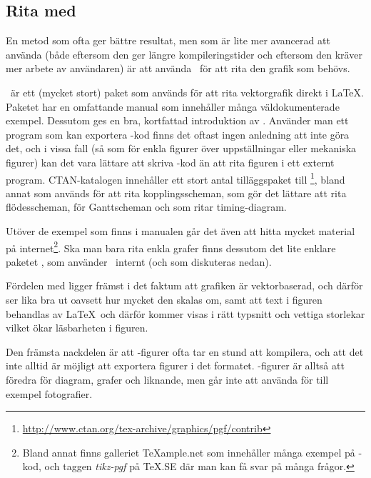 \documentclass[10pt,../../a4.tex]{subfiles}
\begin{document}
\subsection{Rita med \PGFTikZ}
En metod som ofta ger bättre resultat, men som är lite mer avancerad att
använda (både eftersom den ger längre kompileringstider och eftersom den
kräver mer arbete av användaren) är att använda \PGFTikZ\ för att rita
den grafik som behövs.

\PGFTikZ\ är ett (mycket stort) paket som används för att rita
vektorgrafik direkt i \LaTeX. Paketet har en omfattande manual
\parencite{Tantau10} som innehåller många väldokumenterade exempel.
Dessutom ges en bra, kortfattad introduktion av \textcite{Mertz07}.
Använder man ett program som kan exportera \PGFTikZ-kod finns det oftast
ingen anledning att inte göra det, och i vissa fall (så som för enkla
figurer över uppställningar eller mekaniska figurer) kan det vara 
lättare att skriva \PGFTikZ-kod än att rita figuren i ett externt program.
CTAN-katalogen innehåller ett stort antal tilläggspaket till \PGFTikZ%
\footnote{\url{http://www.ctan.org/tex-archive/graphics/pgf/contrib}},
bland annat  \parencite{Redaelli12} som används
för att rita kopplingsscheman,  \parencite{Robson13}
som gör det lättare att rita flödesscheman, 
\parencite{Skala13} för Ganttscheman och 
\parencite{Scharrer11} som ritar timing-diagram.

Utöver de exempel som finns i manualen går det även att hitta mycket
material på internet\footnote{Bland annat finns galleriet
\TeX{}ample.net%
 som innehåller 
många exempel på \PGFTikZ-kod, och taggen \emph{\mbox{tikz-pgf}} på
\TeX.SE
där man kan få svar på många frågor.}. Ska man bara rita enkla grafer
finns dessutom det lite enklare paketet , som använder
\PGFTikZ\ internt (och som diskuteras nedan).%

Fördelen med \PGFTikZ ligger främst i det faktum att grafiken är
vektorbaserad, och därför ser lika bra ut oavsett hur mycket den skalas
om, samt att text i figuren behandlas av \LaTeX\ och därför kommer visas
i rätt typsnitt och vettiga storlekar vilket ökar läsbarheten i figuren.

Den främsta nackdelen är att \PGFTikZ-figurer ofta tar en stund att
kompilera, och att det inte alltid är möjligt att exportera figurer
i det formatet. \PGFTikZ-figurer är alltså att föredra för diagram,
grafer och liknande, men går inte att använda för till exempel
fotografier.
\end{document}
